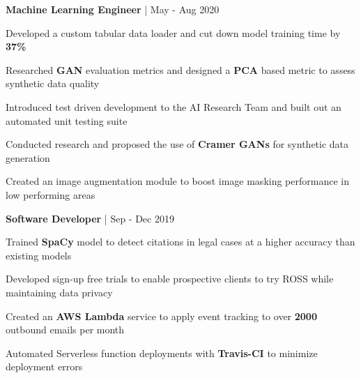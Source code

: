 \begin{cventries}

\cventry
{\textbf{Machine Learning Engineer} | \color{awesome}{PerkinElmer}}
{May - Aug 2020} %
{ %
\begin{cvitems}
\item {Developed a custom tabular data loader and cut down model training time by \textbf{37\%}}
\item {Researched \textbf{GAN} evaluation metrics and designed a \textbf{PCA} based metric to assess synthetic data quality}
\item {Introduced test driven development to the AI Research Team and built out an automated unit testing suite}
\item {Conducted research and proposed the use of \textbf{Cramer GANs} for synthetic data generation}
\item {Created an image augmentation module to boost image masking performance in low performing areas}
\end{cvitems}
}


\cventry
{\textbf{Software Developer} | \color{awesome}{ROSS Intelligence}}
{Sep - Dec 2019} %
{ %
\begin{cvitems}
\item {Trained \textbf{SpaCy} model to detect citations in legal cases at a higher accuracy than existing models}
\item {Developed sign-up free trials to enable prospective clients to try ROSS while maintaining data privacy}
\item {Created an \textbf{AWS Lambda} service to apply event tracking to over \textbf{2000} outbound emails per month}
\item {Automated Serverless function deployments with \textbf{Travis-CI} to minimize deployment errors}
\end{cvitems}
}



\end{cventries}
